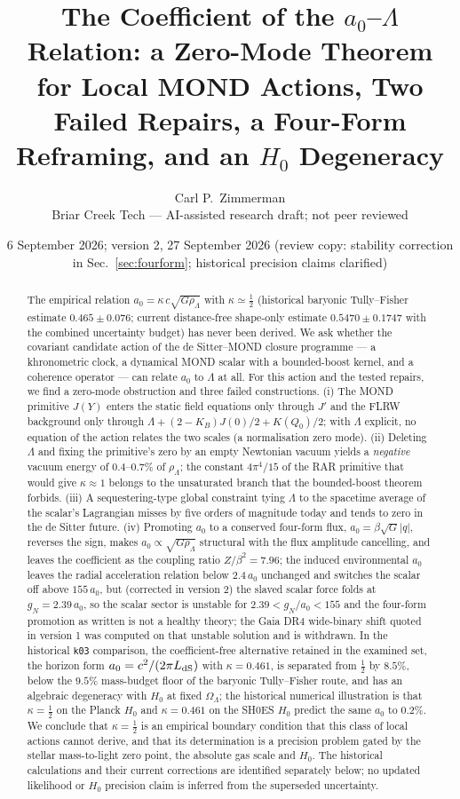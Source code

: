 \documentclass[11pt,letterpaper]{article}
\title{The Coefficient of the $a_0$--$\Lambda$ Relation: a Zero-Mode Theorem for Local MOND Actions, Two Failed Repairs, a Four-Form Reframing, and an $H_0$ Degeneracy}
\author{Carl P.\ Zimmerman\\ \small Briar Creek Tech --- AI-assisted research draft; not peer reviewed}
\date{6 September 2026; version 2, 27 September 2026 (review copy: stability correction in Sec.~\ref{sec:fourform}; historical precision claims clarified)}
\begin{document}
\maketitle
\begin{abstract}
The empirical relation $a_0=\kappa\,c\sqrt{G\rho_\Lambda}$ with $\kappa\simeq\tfrac12$ (historical baryonic Tully--Fisher estimate $0.465\pm0.076$; current distance-free shape-only estimate $0.5470\pm0.1747$ with the combined uncertainty budget) has never been derived. We ask whether the covariant candidate action of the de Sitter--MOND closure programme --- a khronometric clock, a dynamical MOND scalar with a bounded-boost kernel, and a coherence operator --- can relate $a_0$ to $\Lambda$ at all. For this action and the tested repairs, we find a zero-mode obstruction and three failed constructions. (i) The MOND primitive $J(Y)$ enters the static field equations only through $J'$ and the FLRW background only through $\Lambda+(2-K_B)J(0)/2+K(Q_0)/2$; with $\Lambda$ explicit, no equation of the action relates the two scales (a normalisation zero mode). (ii) Deleting $\Lambda$ and fixing the primitive's zero by an empty Newtonian vacuum yields a \emph{negative} vacuum energy of $0.4$--$0.7\%$ of $\rho_\Lambda$; the constant $4\pi^4/15$ of the RAR primitive that would give $\kappa\approx1$ belongs to the unsaturated branch that the bounded-boost theorem forbids. (iii) A sequestering-type global constraint tying $\Lambda$ to the spacetime average of the scalar's Lagrangian misses by five orders of magnitude today and tends to zero in the de Sitter future. (iv) Promoting $a_0$ to a conserved four-form flux, $a_0=\beta\sqrt G|q|$, reverses the sign, makes $a_0\propto\sqrt{G\rho_\Lambda}$ structural with the flux amplitude cancelling, and leaves the coefficient as the coupling ratio $Z/\beta^2=7.96$; the induced environmental $a_0$ leaves the radial acceleration relation below $2.4\,a_0$ unchanged and switches the scalar off above $155\,a_0$, but (corrected in version 2) the slaved scalar force folds at $g_N=2.39\,a_0$, so the scalar sector is unstable for $2.39<g_N/a_0<155$ and the four-form promotion as written is not a healthy theory; the Gaia DR4 wide-binary shift quoted in version 1 was computed on that unstable solution and is withdrawn. In the historical \texttt{k03} comparison, the coefficient-free alternative retained in the examined set, the horizon form $a_0=c^2/(2\pi L_{\rm dS})$ with $\kappa=0.461$, is separated from $\tfrac12$ by $8.5\%$, below the $9.5\%$ mass-budget floor of the baryonic Tully--Fisher route, and has an algebraic degeneracy with $H_0$ at fixed $\Omega_\Lambda$; the historical numerical illustration is that $\kappa=\tfrac12$ on the Planck $H_0$ and $\kappa=0.461$ on the SH0ES $H_0$ predict the same $a_0$ to $0.2\%$. We conclude that $\kappa=\tfrac12$ is an empirical boundary condition that this class of local actions cannot derive, and that its determination is a precision problem gated by the stellar mass-to-light zero point, the absolute gas scale and $H_0$. The historical calculations and their current corrections are identified separately below; no updated likelihood or $H_0$ precision claim is inferred from the superseded uncertainty.
\end{abstract}
\end{document}
